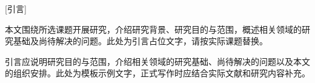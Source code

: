 [引言]

本文围绕所选课题开展研究，介绍研究背景、研究目的与范围，概述相关领域的研究基础及尚待解决的问题。此处为引言占位文字，请按实际课题替换。

引言应说明研究目的与范围，介绍相关领域的研究基础、尚待解决的问题以及本文的组织安排。此处为模板示例文字，正式写作时应结合实际文献和研究内容补充。

